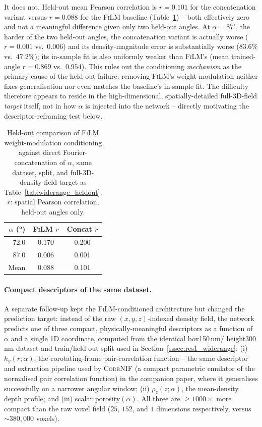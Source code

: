 \documentclass[aip,amsmath,amssymb,reprint]{revtex4-1}
\renewcommand{\ang}{\ensuremath{\alpha}} %
\newcommand{\film}{\textsc{FiLM}}
\begin{document}
It does not. Held-out mean Pearson correlation is
$r=0.101$ for the concatenation variant versus $r=0.088$ for the
\film{} baseline (Table~\ref{tab:concat_heldout}) -- both effectively
zero and not a meaningful difference given only two held-out angles.
At $\ang=87^{\circ}$, the harder of the two held-out angles, the
concatenation variant is actually worse ($r=0.001$ vs.\ $0.006$) and
its density-magnitude error is substantially worse ($83.6\%$ vs.\
$47.2\%$); its in-sample fit is also uniformly weaker than \film{}'s
(mean trained-angle $r=0.869$ vs.\ $0.954$). This rules out the
conditioning \emph{mechanism} as the primary cause of the held-out
failure: removing \film{}'s weight modulation neither fixes
generalisation nor even matches the baseline's in-sample fit. The
difficulty therefore appears to reside in the high-dimensional,
spatially-detailed full-3D-field \emph{target} itself, not in how
$\alpha$ is injected into the network -- directly motivating the
descriptor-reframing test below.

\begin{table}[htbp]
  \centering
  \caption{%
    Held-out comparison of \film{} weight-modulation conditioning
    against direct Fourier-concatenation of $\alpha$, same dataset,
    split, and full-3D-density-field target as
    Table~\ref{tab:widerange_heldout}. $r$: spatial Pearson
    correlation, held-out angles only.
  }
  \label{tab:concat_heldout}
  \begin{tabular}{rcc}
    \toprule
    $\ang$ (°) & \film{} $r$ & Concat $r$ \\
    \midrule
    72.0 & 0.170 & 0.200 \\
    87.0 & 0.006 & 0.001 \\
    \midrule
    Mean & 0.088 & 0.101 \\
    \bottomrule
  \end{tabular}
\end{table}

\paragraph{Compact descriptors of the same dataset.}
A separate follow-up kept the \film{}-conditioned architecture but
changed the prediction target: instead of the raw $(x,y,z)$-indexed
density field, the network predicts one of three compact,
physically-meaningful descriptors as a function of $\ang$ and a
single 1D coordinate, computed from the identical box150\,nm/
height300\,nm dataset and train/held-out split used in
Section~\ref{sssec:res1_widerange}: (i) $h_g(r;\ang)$, the
corotating-frame pair-correlation function -- the same descriptor and
extraction pipeline used by \textsc{CorrNIF} (a compact parametric emulator
of the normalised pair correlation function) in the companion paper, where it
generalises successfully on a narrower angular window; (ii) $\rho_z(z;\ang)$, the
mean-density depth profile; and (iii) scalar porosity$(\ang)$. All
three are $\geq 1000\times$ more compact than the raw voxel field
($25$, $152$, and $1$ dimensions respectively, versus $\sim 380{,}000$
voxels).
\end{document}
